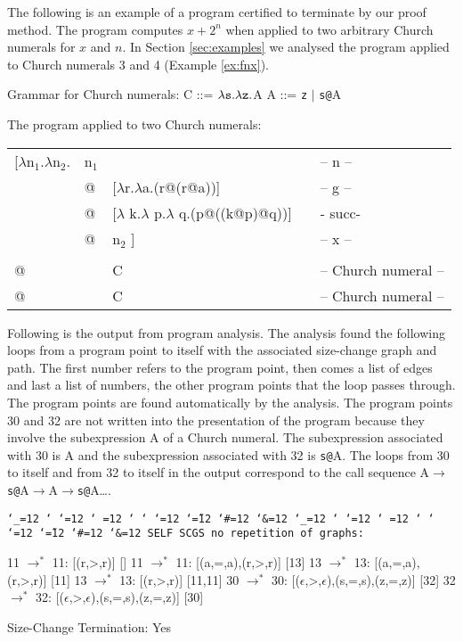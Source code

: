 \documentclass{LMCS}
\makeatletter
\newcommand{\fl}{\noindent}
\newcommand{\hair}{\hspace{2mm}}
\newcommand{\vair}{\relax}
\newcommand{\bt}{\begin{tabular}}
\newcommand{\et}{\end{tabular}}
\newcommand{\bp}{\begin{program}\small}
\newcommand{\ep}{\end{program}}
\newcommand{\programenvironment}{\programmode \def\par{\leavevmode\endgraf}\obeylines\nobreak \programmode}
\newcommand{\programmode}{\tt \catcode`\_=12 \catcode`\?=12 \catcode`\.=12 \catcode`\,=12
	\catcode`\;=12 \catcode`\:=12 \catcode`\@=12 \catcode`\~=12
        \catcode`\#=12 \catcode`\&=12      \obeyspaces\frenchspacing}
\newenvironment{programintext}{\programenvironment}{}
\newenvironment{program}{\setlength{\partopsep}{0mm}\setlength{\topsep}{0mm}
	\begin{trivlist}\item[]
\hspace*{5mm}\begin{minipage}{1.0\textwidth}
\vspace{1mm}
	\begin{programintext}
	}{\end{programintext}
	\vspace{1mm}
	\end{minipage}
	\end{trivlist}
	\noindent}
\theoremstyle{definition}\newtheorem{env}[thm]{Environment}
\makeatother
\begin{document}
\begin{exa}
The following is an example of a  program certified to terminate  by our proof method. The program computes $x + 2^n$ when applied to two arbitrary Church numerals for $x$ and $n$. In Section \ref{sec:examples} we analysed the program applied to Church numerals 3 and 4 (Example \ref{ex:fnx}).
\medskip

\fl Grammar for Church numerals:\hair\hair 
C ::= $\lambda {\tt s}.\lambda {\tt z}.$A\hair\hair
A ::= {\tt z}  $|$ {\tt s}{\tt @}A
\vair

\fl The program applied to two Church numerals:
\vair

{\tt\bt{lllll}
[$\lambda$n$_1$.$\lambda$n$_2$. & n$_1$    &&& -- n --\\
   & @ & [$\lambda$r.$\lambda$a.\fbox{11:}(r@\fbox{13:}(r@a))] && -- 
   g --\\
  & @ & [$\lambda$ k.$\lambda$ p.$\lambda$ q.(p@((k@p)@q))] && - succ-\\
  & @ & n$_2$ ]   && -- x --\\\\
   @ & & C  && -- Church numeral --\\
   @ & & C  && -- Church numeral --
   \et}
\bigskip

Following is the output from program analysis. The analysis found
the following loops from a program point to itself with the associated
size-change graph and path. The first number refers to the program point,
then comes a list of edges and last a list of numbers, the other program
points that the loop passes through. The program points are found automatically by the analysis. The program points 30 and 32 are not written into the presentation of the program because they involve the subexpression A of a Church numeral. The subexpression associated with 30 is A and the subexpression associated with 32 is {\tt s@}A. The loops  from 30 to itself and from 32 to itself in the output correspond to the call sequence 
A$\to${\tt s@}A$\to$A$\to${\tt s@}A\ldots.

\bp
SELF SCGS no repetition of graphs: 

11 $\to^*$ 11: [(r,>,r)]                                     []
11 $\to^*$ 11: [(a,=,a),(r,>,r)]                             [13]
13 $\to^*$ 13: [(a,=,a),(r,>,r)]                             [11]
13 $\to^*$ 13: [(r,>,r)]                                     [11,11]
30 $\to^*$ 30: [($\epsilon$,>,$\epsilon$),(s,=,s),(z,=,z)]   [32]
32 $\to^*$ 32: [($\epsilon$,>,$\epsilon$),(s,=,s),(z,=,z)]   [30]

Size-Change Termination: Yes
\ep


\

\end{exa}
\end{document}
